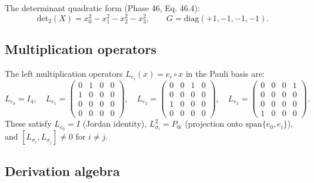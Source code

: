 The determinant quadratic form (Phase 46, Eq. 46.4):
\begin{equation}
  \mathrm{det}_2(X) = x_0^2 - x_1^2 - x_2^2 - x_3^2, \qquad
  G = \mathrm{diag}(+1,-1,-1,-1).
\end{equation}

\subsection{Multiplication operators}

The left multiplication operators $L_{e_i}(x) = e_i \circ x$ in the Pauli
basis are:
\begin{equation}
  L_{e_0} = I_4, \quad
  L_{e_1} = \begin{pmatrix} 0&1&0&0\\1&0&0&0\\0&0&0&0\\0&0&0&0 \end{pmatrix}, \quad
  L_{e_2} = \begin{pmatrix} 0&0&1&0\\0&0&0&0\\1&0&0&0\\0&0&0&0 \end{pmatrix}, \quad
  L_{e_3} = \begin{pmatrix} 0&0&0&1\\0&0&0&0\\0&0&0&0\\1&0&0&0 \end{pmatrix}.
\end{equation}
These satisfy $L_{e_0} = I$ (Jordan identity), $L_{\sigma_i}^2 = P_{0i}$
(projection onto $\mathrm{span}\{e_0, e_i\}$), and $[L_{\sigma_i},
L_{\sigma_j}] \neq 0$ for $i \neq j$.

\subsection{Derivation algebra}


